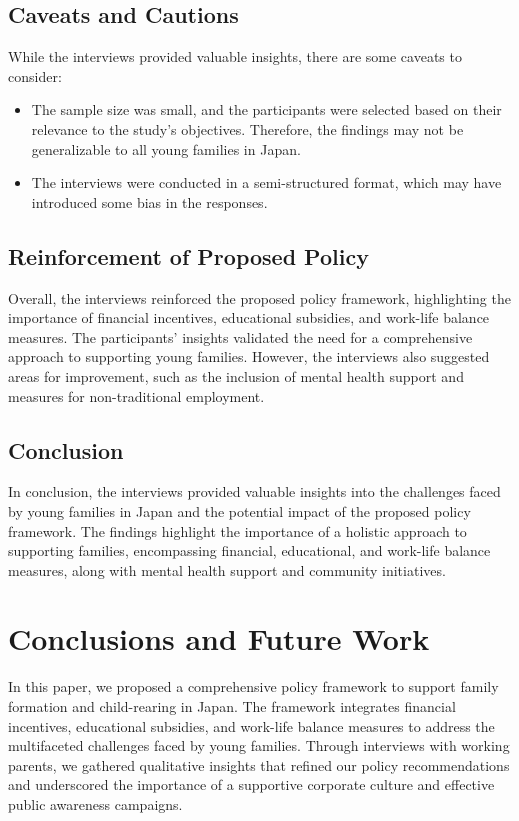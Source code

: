 \documentclass{article} %
\begin{document}
\subsection{Caveats and Cautions}
While the interviews provided valuable insights, there are some caveats to consider:
\begin{itemize}
    \item The sample size was small, and the participants were selected based on their relevance to the study's objectives. Therefore, the findings may not be generalizable to all young families in Japan.
    \item The interviews were conducted in a semi-structured format, which may have introduced some bias in the responses.
\end{itemize}

\subsection{Reinforcement of Proposed Policy}
Overall, the interviews reinforced the proposed policy framework, highlighting the importance of financial incentives, educational subsidies, and work-life balance measures. The participants' insights validated the need for a comprehensive approach to supporting young families. However, the interviews also suggested areas for improvement, such as the inclusion of mental health support and measures for non-traditional employment.

\subsection{Conclusion}
In conclusion, the interviews provided valuable insights into the challenges faced by young families in Japan and the potential impact of the proposed policy framework. The findings highlight the importance of a holistic approach to supporting families, encompassing financial, educational, and work-life balance measures, along with mental health support and community initiatives.

\section{Conclusions and Future Work}
\label{sec:conclusion}

In this paper, we proposed a comprehensive policy framework to support family formation and child-rearing in Japan. The framework integrates financial incentives, educational subsidies, and work-life balance measures to address the multifaceted challenges faced by young families. Through interviews with working parents, we gathered qualitative insights that refined our policy recommendations and underscored the importance of a supportive corporate culture and effective public awareness campaigns.
\end{document}
